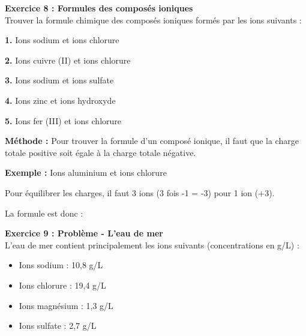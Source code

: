 \documentclass[11pt,a4paper]{article}
\newcommand{\cadreblanc}[1]{%
	\medskip\framebox[\linewidth][c]{%
		\rule{0mm}{#1mm}}\par
	\medskip}
\begin{document}
	\textbf{Exercice 8 : Formules des composés ioniques} \\
	
	Trouver la formule chimique des composés ioniques formés par les ions suivants :
	
	\vspace{5mm}
	
	\textbf{1.} Ions sodium  et ions chlorure 
	
	\cadreblanc{15}
	
	\textbf{2.} Ions cuivre (II)  et ions chlorure 
	
	\cadreblanc{15}
	
	\textbf{3.} Ions sodium  et ions sulfate 
	
	\cadreblanc{15}
	
	\textbf{4.} Ions zinc  et ions hydroxyde 
	
	\cadreblanc{15}
	
	\textbf{5.} Ions fer (III)  et ions chlorure 
	
	\cadreblanc{15}
	
	\vspace{5mm}
	
	\begin{tcolorbox}[colback=red!5!white,colframe=red!75!black]
		{
			\textbf{Méthode :} Pour trouver la formule d'un composé ionique, il faut que la charge totale positive soit égale à la charge totale négative.
			
			\textbf{Exemple :} Ions aluminium  et ions chlorure 
			
			Pour équilibrer les charges, il faut 3 ions  (3 fois -1 = -3) pour 1 ion  (+3).
			
			La formule est donc : 
		}
	\end{tcolorbox}
	
	\vfill
	
	\newpage
	
	\textbf{Exercice 9 : Problème - L'eau de mer} \\
	
	L'eau de mer contient principalement les ions suivants (concentrations en g/L) :
	
	\begin{itemize}
		\item Ions sodium  : 10,8 g/L
		\item Ions chlorure  : 19,4 g/L
		\item Ions magnésium  : 1,3 g/L
		\item Ions sulfate  : 2,7 g/L
	\end{itemize}
	
\end{document}
